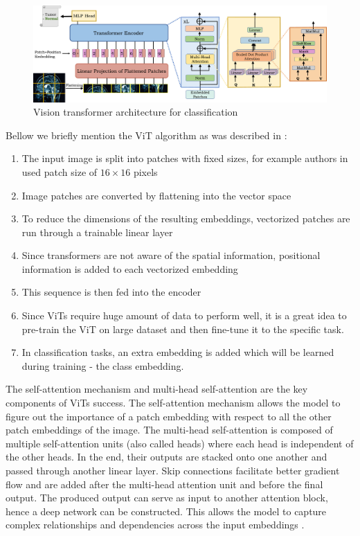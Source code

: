 \begin{figure}[H]
    \begin{centering}
    \includegraphics[width=14cm]{assets/images/vit.jpg}
    \par\end{centering}
    \caption{Vision transformer architecture for classification \cite{Shamshad2023}}
    \label{fig:vit}
\end{figure}

Bellow we briefly mention the ViT algorithm as was described in \cite{Shamshad2023}:

\begin{enumerate}
    \item The input image is split into patches with fixed sizes, for example authors in \cite{Dosovitskiy2020} used patch size of $16\!\times\!16$ pixels
    \item Image patches are converted by flattening into the vector space
    \item To reduce the dimensions of the resulting embeddings, vectorized patches are run through a trainable linear layer
    \item Since transformers are not aware of the spatial information, positional information is added to each vectorized embedding
    \item This sequence is then fed into the encoder
    \item Since ViTs require huge amount of data to perform well, it is a great idea to pre-train the ViT on large dataset and then fine-tune it to the specific task.
    \item In classification tasks, an extra embedding is added which will be learned during training - the class embedding.
\end{enumerate}

The self-attention mechanism and multi-head self-attention are the key components of ViTs success. The self-attention mechanism allows the model to figure out the importance of a patch embedding with respect to all the other patch embeddings of the image. The multi-head self-attention is composed of multiple self-attention units (also called heads) where each head is independent of the other heads. In the end, their outputs are stacked onto one another and passed through another linear layer. Skip connections facilitate better gradient flow and are added after the multi-head attention unit and before the final output. The produced output can serve as input to another attention block, hence a deep network can be constructed. This allows the model to capture complex relationships and dependencies across the input embeddings \cite{Shamshad2023}.

